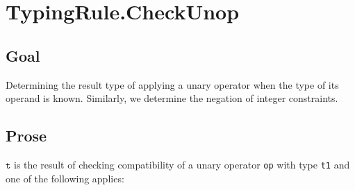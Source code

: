\documentclass{book}
\newcommand\vt[0]{\texttt{t}}
\begin{document}
\section{TypingRule.CheckUnop \label{sec:TypingRule.CheckUnop}}

\subsection{Goal}
  Determining the result type of applying a unary operator when the type of its operand is known.
  Similarly, we determine the negation of integer constraints.

\subsection{Prose}
  $\vt$ is the result of checking compatibility of a unary operator \texttt{op} with
  type \texttt{t1} and one of the following applies:
\end{document}
